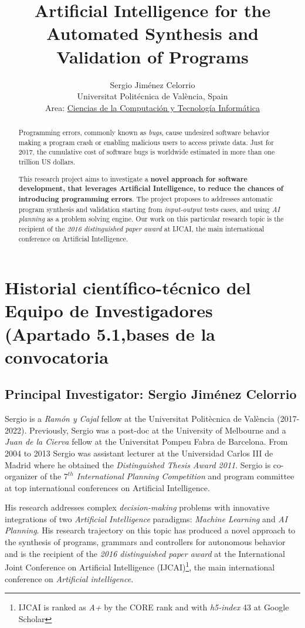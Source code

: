 \documentclass[10pt,a4paper]{paper}
\title{Artificial Intelligence for the Automated Synthesis and Validation of Programs}
\author{Sergio Jim\'enez Celorrio\\
\footnotesize Universitat Politécnica de València, Spain\\
\small Area: \underline{Ciencias de la Computación y Tecnología Informática}}
\begin{document}
\maketitle

\begin{abstract}
Programming errors, commonly known as {\em bugs}, cause undesired software behavior making a program crash or enabling malicious users to access private data. Just for 2017, the cumulative cost of software bugs is worldwide estimated in more than one trillion US dollars. 

This research project aims to investigate a {\bf novel approach for software development, that leverages Artificial Intelligence, to reduce the chances of introducing programming errors}. The project proposes to addresses automatic program synthesis and validation starting from {\em input-output} tests cases, and using {\em AI planning} as a problem solving engine. Our work on this particular research topic is the recipient of the {\em 2016 distinguished paper award} at {\sc IJCAI}, the main international conference on Artificial Intelligence.
\end{abstract}

\section{Historial científico-técnico del Equipo de Investigadores (Apartado 5.1,bases de la convocatoria}

\subsection{Principal Investigator: Sergio Jiménez Celorrio}
Sergio is a {\em Ramón y Cajal} fellow at the Universitat Politècnica de València (2017-2022). Previously, Sergio was a post-doc at the University of Melbourne and a {\em Juan de la Cierva} fellow at the Universitat Pompeu Fabra de Barcelona. From 2004 to 2013 Sergio was assistant lecturer at the Universidad Carlos III de Madrid where he obtained the {\em Distinguished Thesis Award 2011}. Sergio is co-organizer of the {\em $7^{th}$ International Planning Competition} and program committee at top international conferences on Artificial Intelligence.

His research addresses complex {\em decision-making} problems with innovative integrations of two {\em Artificial Intelligence} paradigms: {\em Machine Learning} and {\em AI Planning}. His research trajectory on this topic has produced a novel approach to the synthesis of programs, grammars and controllers for autonomous behavior and is the recipient of the {\it 2016 distinguished paper award} at the International Joint Conference on Artificial Intelligence (IJCAI)\footnote{IJCAI is ranked as {\it A+} by the CORE rank and with {\it h5-index} 43 at Google Scholar}, the main international conference on {\em Artificial intelligence}.
\end{document}
